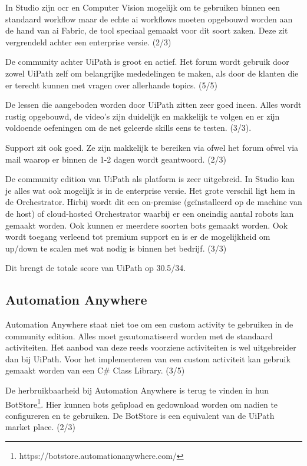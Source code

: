 In Studio zijn \acrshort{ocr} en Computer Vision mogelijk om te gebruiken binnen een standaard \gls{workflow} maar de echte \acrshort{ai} \gls{workflow}s moeten opgebouwd worden aan de hand van \acrshort{ai} Fabric, de tool speciaal gemaakt voor dit soort zaken. Deze zit vergrendeld achter een enterprise versie. (2/3)

De community achter UiPath is groot en actief. Het forum wordt gebruik door zowel UiPath zelf om belangrijke mededelingen te maken, als door de klanten die er terecht kunnen met vragen over allerhande topics. (5/5)

De lessen die aangeboden worden door UiPath zitten zeer goed ineen. Alles wordt rustig opgebouwd, de video's zijn duidelijk en makkelijk te volgen en er zijn voldoende oefeningen om de net geleerde skills eens te testen. (3/3).

Support zit ook goed. Ze zijn makkelijk te bereiken via ofwel het forum ofwel via mail waarop er binnen de 1-2 dagen wordt geantwoord. (2/3)

De community edition van UiPath als platform is zeer uitgebreid. In Studio kan je alles wat ook mogelijk is in de enterprise versie. Het grote verschil ligt hem in de Orchestrator. Hirbij wordt dit een on-premise (geïnstalleerd op de machine van de host) of cloud-hosted Orchestrator waarbij er een oneindig aantal robots kan gemaakt worden. Ook kunnen er meerdere soorten bots gemaakt worden. Ook wordt toegang verleend tot premium support en is er de mogelijkheid om up/down te scalen met wat nodig is binnen het bedrijf. (3/3)

Dit brengt de totale score van UiPath op 30.5/34.

\subsection{Automation Anywhere}
Automation Anywhere staat niet toe om een custom activity te gebruiken in de community edition. Alles moet geautomatiseerd worden met de standaard \gls{activiteit}en. Het aanbod van deze reeds voorziene \gls{activiteit}en is wel uitgebreider dan bij UiPath. Voor het implementeren van een custom \gls{activiteit} kan gebruik gemaakt worden van een C\# Class Library. (3/5)

De herbruikbaarheid bij Automation Anywhere is terug te vinden in hun BotStore\footnote{https://botstore.automationanywhere.com/}. Hier kunnen bots geüpload en gedownload worden om nadien te configureren en te gebruiken. De BotStore is een equivalent van de UiPath market place. (2/3)

